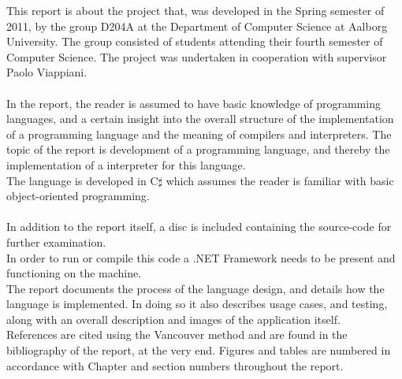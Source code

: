 This report is about the project that, was developed in the Spring semester of 2011, by the group D204A at the Department of Computer Science at Aalborg University. The group consisted of students attending their fourth semester of Computer Science. The project was undertaken in cooperation with supervisor Paolo Viappiani. \\
\\
In the report, the reader is assumed to have basic knowledge of programming languages, and a certain insight into the overall structure of the implementation of a programming language and the meaning of compilers and interpreters. The topic of the report is development of a programming language, and thereby the implementation of a interpreter for this language. \\
The language is developed in C$\sharp$ which assumes the reader is familiar with basic object-oriented programming. \\
\\
In addition to the report itself, a disc is included containing the source-code for further examination. \\
In order to run or compile this code a .NET Framework needs to be present and functioning on the machine. \\

The report documents the process of the language design, and details how the language is implemented. In doing so it also describes usage cases, and testing, along with an overall description and images of the application itself. \\

References are cited using the Vancouver method and are found in the bibliography of the report, at the very end. 
Figures and tables are numbered in accordance with Chapter and section numbers throughout the report.

\newpage\mbox{}\newpage
